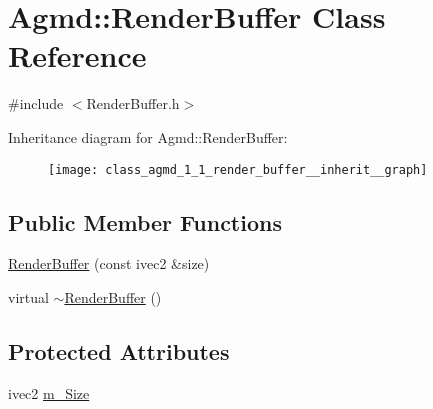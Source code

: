 \hypertarget{class_agmd_1_1_render_buffer}{\section{Agmd\+:\+:Render\+Buffer Class Reference}
\label{class_agmd_1_1_render_buffer}
}


{\ttfamily \#include $<$Render\+Buffer.\+h$>$}



Inheritance diagram for Agmd\+:\+:Render\+Buffer\+:\nopagebreak
\begin{figure}[H]
\begin{center}
\leavevmode
\texttt{[image: class\_agmd\_1\_1\_render\_buffer\_\_inherit\_\_graph]}
\end{center}
\end{figure}
\subsection*{Public Member Functions}
\begin{DoxyCompactItemize}
\item 
\hyperlink{class_agmd_1_1_render_buffer_a6213bf44b8ad9f317972b11c8e5d9eb3}{Render\+Buffer} (const ivec2 \&size)
\item 
virtual \hyperlink{class_agmd_1_1_render_buffer_a49440e7526082e8028f0a03c8e068c4b}{$\sim$\+Render\+Buffer} ()
\end{DoxyCompactItemize}
\subsection*{Protected Attributes}
\begin{DoxyCompactItemize}
\item 
ivec2 \hyperlink{class_agmd_1_1_render_buffer_a92c5314800c8022d04b89c04625e2d93}{m\+\_\+\+Size}
\end{DoxyCompactItemize}


